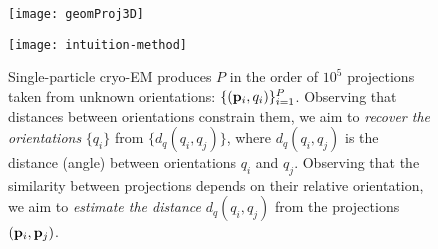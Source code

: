 \begin{figure}
    \begin{minipage}[t]{0.48\linewidth}
        \centering
        \texttt{[image: geomProj3D]}
        \caption{%
            Geometry of the imaging model defined in .
            The 3D protein structure $\x$ in the coordinate system $(x_1, x_2, x_3)$ is imaged along the orientation $\bth$ to produce the 2D \textit{projection} $\p$ in the coordinate system $(y_1, y_2)$ of the microscope's detector plane.
            The direction $(\theta_2, \theta_1) \in [0,\pi[ \, \times \, [0,2\pi]$ (parameterizing the sphere $\mathbb{S}^2$) and the in-plane rotation $\theta_3 \in [0,2\pi[$ (parameterizing the circle $\mathbb{S}^1$) form the \textit{orientation} $\bth = (\theta_3, \theta_2, \theta_1)$.
            In our work, we represent the orientation $\bth$ as a unit quaternion $q$.
        }\label{fig:imaging-geometry}
    \end{minipage}
    \hfill
    \begin{minipage}[t]{0.48\linewidth}
        \centering
        \texttt{[image: intuition-method]}
        \caption{%
            Single-particle cryo-EM produces $P$ in the order of $10^5$ projections taken from unknown orientations: $\{(\mathbf{p}_i, q_i)\}_{i=1}^P$.
            Observing that distances between orientations constrain them, we aim to \textit{recover the orientations} $\{q_i\}$ from $\{d_q(q_i, q_j)\}$, where $d_q(q_i, q_j)$ is the distance (angle) between orientations $q_i$ and $q_j$.
            Observing that the similarity between projections depends on their relative orientation, we aim to \textit{estimate the distance} $d_q(q_i, q_j)$ from the projections $(\mathbf{p}_i, \mathbf{p}_j)$.
        }\label{fig:intuition-method}
    \end{minipage}
\end{figure}

